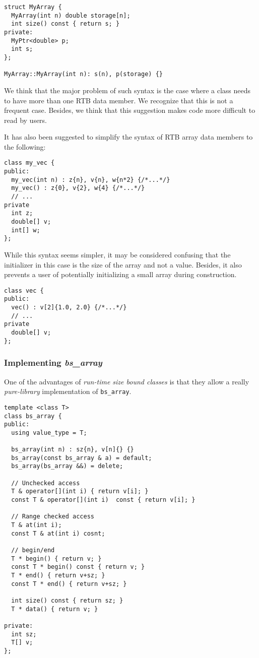 \begin{lstlisting}
struct MyArray {
  MyArray(int n) double storage[n];
  int size() const { return s; }
private:
  MyPtr<double> p;
  int s;
};

MyArray::MyArray(int n): s(n), p(storage) {}
\end{lstlisting}

We think that the major problem of such syntax is the case where a class needs
to have more than one RTB data member. We recognize that this is not a frequent
case.  Besides, we think that this suggestion makes code more difficult to read
by users.

It has also been suggested to simplify the syntax of RTB array data members to
the following:

\begin{lstlisting}
class my_vec {
public:
  my_vec(int n) : z{n}, v{n}, w{n*2} {/*...*/}
  my_vec() : z{0}, v{2}, w{4} {/*...*/}
  // ...
private
  int z;
  double[] v;
  int[] w;
};
\end{lstlisting}

While this syntax seems simpler, it may be considered confusing that the
initializer in this case is the size of the array and not a value. Besides, it
also prevents a user of potentially initializing a small array during
construction.

\begin{lstlisting}
class vec {
public:
  vec() : v[2]{1.0, 2.0} {/*...*/}
  // ...
private
  double[] v;
};
\end{lstlisting}

\subsubsection{Implementing \emph{bs\_array}}

One of the advantages of \emph{run-time size bound classes} is that they allow a
really \emph{pure-library} implementation of \verb+bs_array+.

\begin{lstlisting}
template <class T>
class bs_array {
public:
  using value_type = T;

  bs_array(int n) : sz{n}, v[n]{} {}
  bs_array(const bs_array & a) = default;
  bs_array(bs_array &&) = delete;

  // Unchecked access
  T & operator[](int i) { return v[i]; }
  const T & operator[](int i)  const { return v[i]; }

  // Range checked access
  T & at(int i);
  const T & at(int i) cosnt;

  // begin/end
  T * begin() { return v; }
  const T * begin() const { return v; }
  T * end() { return v+sz; }
  const T * end() { return v+sz; }

  int size() const { return sz; }
  T * data() { return v; }

private:
  int sz;
  T[] v;
};
\end{lstlisting}

